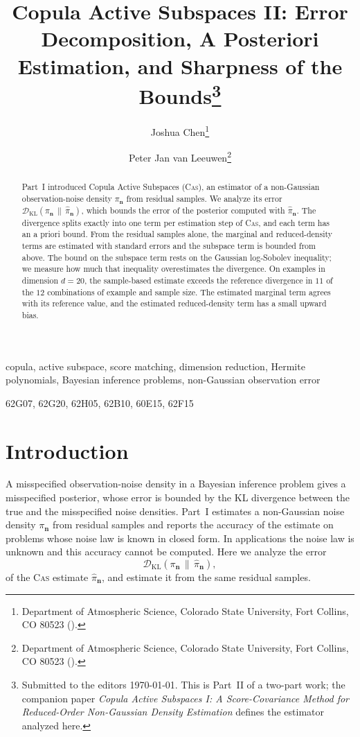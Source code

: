 \documentclass[review,hidelinks,onefignum,onetabnum]{siamart251216}
\title{Copula Active Subspaces II: Error Decomposition, A Posteriori Estimation, and Sharpness of the Bounds\thanks{Submitted to the editors \today. This is Part~II of a two-part work; the companion paper \emph{Copula Active Subspaces I: A Score-Covariance Method for Reduced-Order Non-Gaussian Density Estimation} defines the estimator analyzed here. \funding{This work was supported by the Consortium for Advanced Data Assimilation Research and Education (CADRE), funded by NOAA under grant 2007893.}}}
\author{%
  Joshua Chen\thanks{Department of Atmospheric Science, Colorado State University, Fort Collins, CO 80523 (\email{Joshua.Chen@colostate.edu}).}
  \and
  Peter Jan van Leeuwen\thanks{Department of Atmospheric Science, Colorado State University, Fort Collins, CO 80523 (\email{Peter.vanLeeuwen@colostate.edu}).}
}
\newcommand{\DKL}{\mathcal{D}_{\mathrm{KL}}}
\newcommand{\vn}{\bm{n}}
\begin{document}
\maketitle

\begin{abstract}

Part~I introduced Copula Active Subspaces (\textsc{Cas}), an estimator of a non-Gaussian observation-noise density $\pi_{\vn}$ from residual samples. We analyze its error $\DKL(\pi_{\vn}\,\|\,\widehat\pi_{\vn})$, which bounds the error of the posterior computed with $\widehat\pi_{\vn}$. The divergence splits exactly into one term per estimation step of \textsc{Cas}, and each term has an a priori bound. From the residual samples alone, the marginal and reduced-density terms are estimated with standard errors and the subspace term is bounded from above. The bound on the subspace term rests on the Gaussian log-Sobolev inequality; we measure how much that inequality overestimates the divergence. On examples in dimension $d = 20$, the sample-based estimate exceeds the reference divergence in $11$ of the $12$ combinations of example and sample size. The estimated marginal term agrees with its reference value, and the estimated reduced-density term has a small upward bias.
\end{abstract}

\begin{keywords}
copula, active subspace, score matching, dimension reduction, Hermite polynomials, Bayesian inference problems, non-Gaussian observation error
\end{keywords}

\begin{MSCcodes}
62G07, 62G20, 62H05, 62B10, 60E15, 62F15
\end{MSCcodes}

\section{Introduction}
\label{sec:intro}

A misspecified observation-noise density in a Bayesian inference problem gives a misspecified posterior, whose error is bounded by the KL divergence between the true and the misspecified noise densities. Part~I \cite{CAS_partI} estimates a non-Gaussian noise density $\pi_{\vn}$ from residual samples and reports the accuracy of the estimate on problems whose noise law is known in closed form. In applications the noise law is unknown and this accuracy cannot be computed. Here we analyze the error
\begin{equation}
  \DKL(\pi_{\vn}\,\|\,\widehat\pi_{\vn}),
  \label{eq:target-error}
\end{equation}
of the \textsc{Cas} estimate $\widehat\pi_{\vn}$, and estimate it from the same residual samples.
\end{document}
